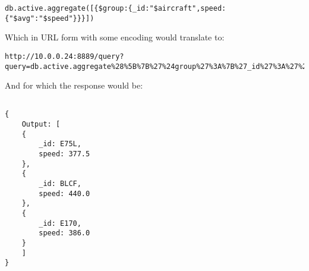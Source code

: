 \begin{code}
	\begin{verbatim}
db.active.aggregate([{$group:{_id:"$aircraft",speed:{"$avg":"$speed"}}}])
	\end{verbatim}
\end{code}

Which in URL form with some encoding would translate to:

\begin{code}
	\begin{verbatim}
http://10.0.0.24:8889/query?query=db.active.aggregate%28%5B%7B%27%24group%27%3A%7B%27_id%27%3A%27%24aircraft%27%2C%27speed%27%3A%7B%27%24avg%27%3A%27%24speed%27%7D%7D%7D%5D%29&user.name=airtraffic
	\end{verbatim}
\end{code}

And for which the response would be:

\begin{code}
	\begin{verbatim}

{
    Output: [
    {
        _id: E75L, 
        speed: 377.5
    }, 
    {
        _id: BLCF, 
        speed: 440.0
    }, 
    {
        _id: E170, 
        speed: 386.0
    }
    ]
}
	\end{verbatim}
\end{code}
\pagebreak